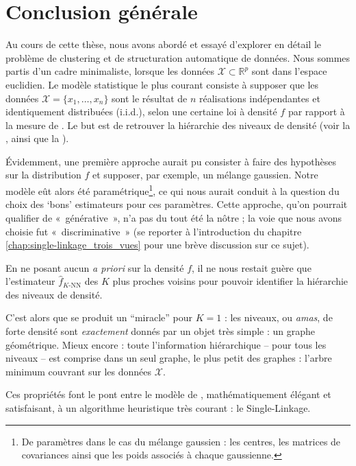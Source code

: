 \chapter{Conclusion générale}
\label{chap:conclusion}

Au cours de cette thèse, nous avons abordé et essayé d'explorer en détail le problème de clustering et de structuration automatique de données.
Nous sommes partis d'un cadre minimaliste, lorsque les données $\mathcal X \subset \mathbb R^p$ sont dans l'espace euclidien. Le modèle statistique le plus courant consiste à supposer que les données $\mathcal X = \bigl\{ x_1, \ldots , x_n \bigr\}$ sont le résultat de $n$ réalisations indépendantes et identiquement distribuées (i.i.d.), selon une certaine loi à densité $f$ par rapport à la mesure de .
Le but est de retrouver la hiérarchie des niveaux de densité (voir la , ainsi que la ).

Évidemment, une première approche aurait pu consister à faire des hypothèses sur la distribution $f$ et supposer, par exemple, un mélange gaussien. Notre modèle eût alors été paramétrique\footnote{De paramètres dans le cas du mélange gaussien : les centres, les matrices de covariances ainsi que les poids associés à chaque gaussienne.}, ce qui nous aurait conduit à la question du choix des `bons' estimateurs pour ces paramètres.
Cette approche, qu'on pourrait qualifier de «~générative~», n'a pas du tout été la nôtre ; la voie que nous avons choisie fut «~discriminative~» (se reporter à l’introduction du chapitre \ref{chap:single-linkage_trois_vues} pour une brève discussion sur ce sujet).

En ne posant aucun \emph{a priori} sur la densité $f$, il ne nous restait guère que l'estimateur $\widehat f_ {K\text{-NN}}$ des $K$ plus proches voisins pour pouvoir identifier la hiérarchie des niveaux de densité.

C'est alors que se produit un ``miracle'' pour $K=1$ : les niveaux, ou \emph{amas}, de forte densité sont \emph{exactement} donnés par un objet très simple : un graphe géométrique. 
Mieux encore : toute l'information hiérarchique -- pour tous les niveaux -- est comprise dans un seul graphe, le plus petit des graphes : l'arbre minimum couvrant sur les données $\mathcal X$.

Ces propriétés font le pont entre le modèle de , mathématiquement élégant et satisfaisant, à un algorithme heuristique très courant : le Single-Linkage.

